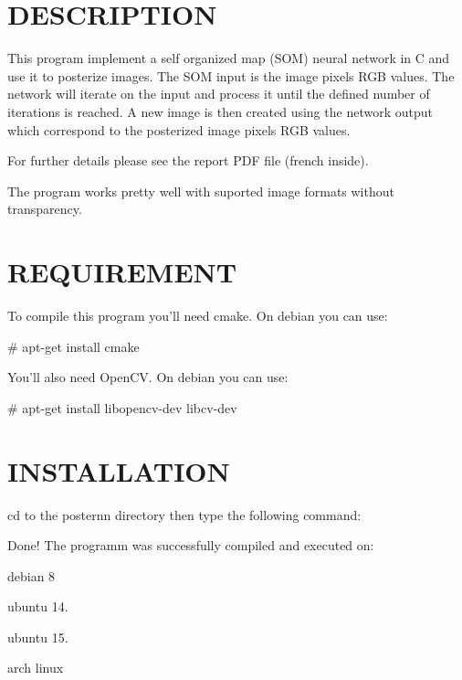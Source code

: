 \section*{D\-E\-S\-C\-R\-I\-P\-T\-I\-O\-N }

This program implement a self organized map (S\-O\-M) neural network in C and use it to posterize images. The S\-O\-M input is the image pixels R\-G\-B values. The network will iterate on the input and process it until the defined number of iterations is reached. A new image is then created using the network output which correspond to the posterized image pixels R\-G\-B values.

For further details please see the report P\-D\-F file (french inside).

The program works pretty well with suported image formats without transparency.

\section*{R\-E\-Q\-U\-I\-R\-E\-M\-E\-N\-T }

To compile this program you'll need cmake. On debian you can use\-: 
\begin{DoxyCode}
\textcolor{preprocessor}{# apt-get install cmake}
\end{DoxyCode}


You'll also need Open\-C\-V. On debian you can use\-: 
\begin{DoxyCode}
\textcolor{preprocessor}{# apt-get install libopencv-dev libcv-dev}
\end{DoxyCode}


\section*{I\-N\-S\-T\-A\-L\-L\-A\-T\-I\-O\-N }

cd to the posternn directory then type the following command\-: 


Done! The programm was successfully compiled and executed on\-:
\begin{DoxyItemize}
\item debian 8
\item ubuntu 14.
\item ubuntu 15.
\item arch linux
\end{DoxyItemize}

